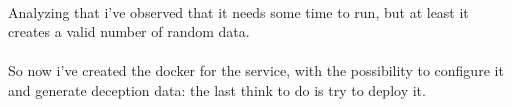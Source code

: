 \\
Analyzing that i've observed that it needs some time to run, but at least it creates a valid number of random data. 
\\\\
So now i've created the docker for the service, with the possibility to configure it and generate deception data: the last think to do is try to deploy it.
